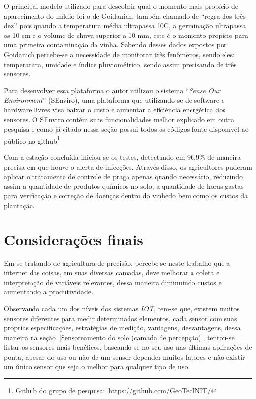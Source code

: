 \documentclass[
article,			%
12pt,				%
oneside,			%
a4paper,			%
english,			%
brazil,				%
sumario=tradicional
]{abntex2}
\begin{document}
O principal modelo utilizado para descobrir qual o momento mais propício de aparecimento do míldio foi o de Goidanich\cite{detectando_milidio}, também chamado de ``regra dos três dez'' pois quando a temperatura média ultrapassa 10\textdegree C, a germinação ultrapassa os 10 cm e o volume de chuva superior a 10 mm, este é o momento propício para uma primeira contaminação da vinha.
Sabendo desses dados expostos por Goidanich\cite{detectando_milidio} percebe-se a necessidade de monitorar três fenômenos, sendo eles: temperatura, umidade e índice pluviométrico, sendo assim precisando de três sensores.

Para desenvolver essa plataforma o autor utilizou o sistema ``\textit{Sense Our Environment}'' (SEnviro), uma plataforma que utilizando-se de software e hardware livres visa baixar o custo e aumentar a eficiência energética dos sensores\cite{2}. O SEnviro contém suas funcionalidades melhor explicado em outra pesquisa\cite{SEnviro} e como já citado nessa seção possui todos os códigos fonte disponível ao público no github\footnote{Github do grupo de pesquisa:~\url{https://github.com/GeoTecINIT/}}


Com a estação concluída iniciou-se os testes, detectando em 96,9\% de maneira precisa em que houve o alerta de infecções. Através disso, os agricultores puderam aplicar o tratamento de controle de praga apenas quando necessário, reduzindo assim a quantidade de produtos químicos no solo, a quantidade de horas gastas para verificação e correção de doenças dentro do vinhedo bem como os custos da plantação.

\section{Considerações finais}
Em se tratando de agricultura de precisão, percebe-se neste trabalho que a internet das coisas, em suas diversas camadas, deve melhorar a coleta e interpretação de variáveis relevantes, dessa maneira diminuindo custos e aumentando a produtividade.

Observando cada um dos níveis dos sistemas \textit{IOT}, tem-se que, existem muitos sensores diferentes para medir determinados elementos, cada sensor com suas próprias especificações, estratégias de medição, vantagens, desvantagens, dessa maneira na seção~\ref{Sensoreamento do solo (camada de percepção)}, tentou-se listar os sensores mais benéficos, baseando-se no seu uso nas últimas aplicações de ponta, apesar do uso ou não de um sensor depender muitos fatores e não existir um único sensor que seja o melhor para qualquer tipo de uso.
\end{document}
